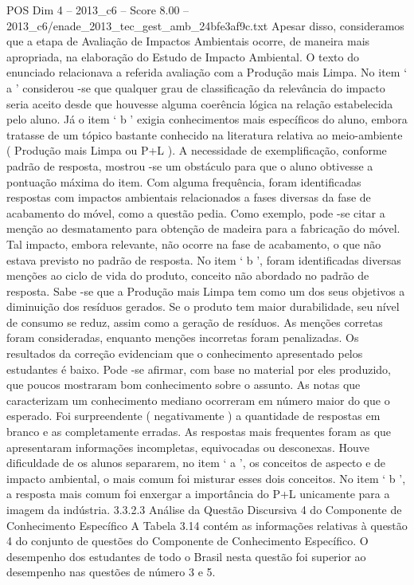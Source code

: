 \begin{textsample}{POS Dim 4 – 2013\_c6 – Score 8.00 – 2013\_c6/enade\_2013\_tec\_gest\_amb\_24bfe3af9c.txt}
Apesar disso, consideramos que a etapa de Avaliação de Impactos Ambientais ocorre, de maneira mais apropriada, na elaboração do Estudo de Impacto Ambiental.
O texto do enunciado relacionava a referida avaliação com a Produção mais Limpa.
No item ‘ a ’ considerou -se que qualquer grau de classificação da relevância do impacto seria aceito desde que houvesse alguma coerência lógica na relação estabelecida pelo aluno.
Já o item ‘ b ’ exigia conhecimentos mais específicos do aluno, embora tratasse de um tópico bastante conhecido na literatura relativa ao meio-ambiente ( Produção mais Limpa ou P+L ).
A necessidade de exemplificação, conforme padrão de resposta, mostrou -se um obstáculo para que o aluno obtivesse a pontuação máxima do item.
Com alguma frequência, foram identificadas respostas com impactos ambientais relacionados a fases diversas da fase de acabamento do móvel, como a questão pedia.
Como exemplo, pode -se citar a menção ao desmatamento para obtenção de madeira para a fabricação do móvel.
Tal impacto, embora relevante, não ocorre na fase de acabamento, o que não estava previsto no padrão de resposta.
No item ‘ b ’, foram identificadas diversas menções ao ciclo de vida do produto, conceito não abordado no padrão de resposta.
Sabe -se que a Produção mais Limpa tem como um dos seus objetivos a diminuição dos resíduos gerados.
Se o produto tem maior durabilidade, seu nível de consumo se reduz, assim como a geração de resíduos.
As menções corretas foram consideradas, enquanto menções incorretas foram penalizadas.
Os resultados da correção evidenciam que o conhecimento apresentado pelos estudantes é baixo.
Pode -se afirmar, com base no material por eles produzido, que poucos mostraram bom conhecimento sobre o assunto.
As notas que caracterizam um conhecimento mediano ocorreram em número maior do que o esperado.
Foi surpreendente ( negativamente ) a quantidade de respostas em branco e as completamente erradas.
As respostas mais frequentes foram as que apresentaram informações incompletas, equivocadas ou desconexas.
Houve dificuldade de os alunos separarem, no item ‘ a ’, os conceitos de aspecto e de impacto ambiental, o mais comum foi misturar esses dois conceitos.
No item ‘ b ’, a resposta mais comum foi enxergar a importância do P+L unicamente para a imagem da indústria. 3.3.2.3 Análise da Questão Discursiva 4 do Componente de Conhecimento Específico A Tabela 3.14 contém as informações relativas à questão 4 do conjunto de questões do Componente de Conhecimento Específico.
O desempenho dos estudantes de todo o Brasil nesta questão foi superior ao desempenho nas questões de número 3 e 5.

\end{textsample}
